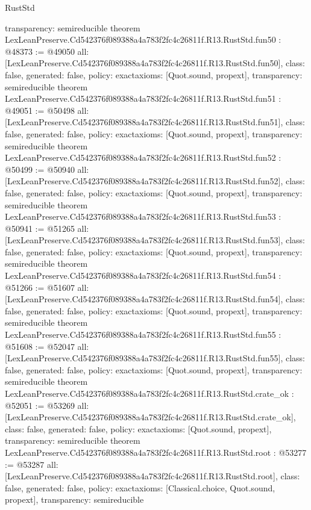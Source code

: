 \begin{lexlean}{RustStd}
\begin{coremodule}
{  transparency: semireducible
}
theorem LexLeanPreserve.Cd542376f089388a4a783f2fc4c26811f.R13.RustStd.fun50 : @48373 := @49050 {
  all: [LexLeanPreserve.Cd542376f089388a4a783f2fc4c26811f.R13.RustStd.fun50],
  class: false,
  generated: false,
  policy: exact{axioms: [Quot.sound, propext]},
  transparency: semireducible
}
theorem LexLeanPreserve.Cd542376f089388a4a783f2fc4c26811f.R13.RustStd.fun51 : @49051 := @50498 {
  all: [LexLeanPreserve.Cd542376f089388a4a783f2fc4c26811f.R13.RustStd.fun51],
  class: false,
  generated: false,
  policy: exact{axioms: [Quot.sound, propext]},
  transparency: semireducible
}
theorem LexLeanPreserve.Cd542376f089388a4a783f2fc4c26811f.R13.RustStd.fun52 : @50499 := @50940 {
  all: [LexLeanPreserve.Cd542376f089388a4a783f2fc4c26811f.R13.RustStd.fun52],
  class: false,
  generated: false,
  policy: exact{axioms: [Quot.sound, propext]},
  transparency: semireducible
}
theorem LexLeanPreserve.Cd542376f089388a4a783f2fc4c26811f.R13.RustStd.fun53 : @50941 := @51265 {
  all: [LexLeanPreserve.Cd542376f089388a4a783f2fc4c26811f.R13.RustStd.fun53],
  class: false,
  generated: false,
  policy: exact{axioms: [Quot.sound, propext]},
  transparency: semireducible
}
theorem LexLeanPreserve.Cd542376f089388a4a783f2fc4c26811f.R13.RustStd.fun54 : @51266 := @51607 {
  all: [LexLeanPreserve.Cd542376f089388a4a783f2fc4c26811f.R13.RustStd.fun54],
  class: false,
  generated: false,
  policy: exact{axioms: [Quot.sound, propext]},
  transparency: semireducible
}
theorem LexLeanPreserve.Cd542376f089388a4a783f2fc4c26811f.R13.RustStd.fun55 : @51608 := @52047 {
  all: [LexLeanPreserve.Cd542376f089388a4a783f2fc4c26811f.R13.RustStd.fun55],
  class: false,
  generated: false,
  policy: exact{axioms: [Quot.sound, propext]},
  transparency: semireducible
}
theorem LexLeanPreserve.Cd542376f089388a4a783f2fc4c26811f.R13.RustStd.crate_ok : @52051 := @53269 {
  all: [LexLeanPreserve.Cd542376f089388a4a783f2fc4c26811f.R13.RustStd.crate_ok],
  class: false,
  generated: false,
  policy: exact{axioms: [Quot.sound, propext]},
  transparency: semireducible
}
theorem LexLeanPreserve.Cd542376f089388a4a783f2fc4c26811f.R13.RustStd.root : @53277 := @53287 {
  all: [LexLeanPreserve.Cd542376f089388a4a783f2fc4c26811f.R13.RustStd.root],
  class: false,
  generated: false,
  policy: exact{axioms: [Classical.choice, Quot.sound, propext]},
  transparency: semireducible
}


\end{coremodule}
\end{lexlean}
